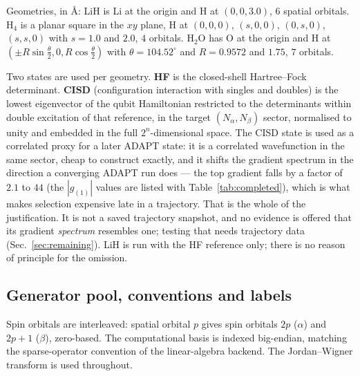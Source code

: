\documentclass[10pt]{article}
\begin{document}
Geometries, in \si{\angstrom}: LiH is Li at the origin and H at $(0,0,3.0)$,
$6$ spatial orbitals. H$_4$ is a planar square in the $xy$ plane, H at $(0,0,0)$,
$(s,0,0)$, $(0,s,0)$, $(s,s,0)$ with $s=1.0$ and $2.0$, $4$ orbitals. H$_2$O has
O at the origin and H at $(\pm R\sin\tfrac{\theta}{2},0,R\cos\tfrac{\theta}{2})$
with $\theta=104.52^\circ$ and $R=0.9572$ and $1.75$, $7$ orbitals.

Two states are used per geometry. \textbf{HF} is the closed-shell Hartree--Fock determinant. \textbf{CISD} (configuration interaction with singles and doubles) is the lowest eigenvector of the qubit Hamiltonian restricted to the determinants within double excitation of that reference, in the target $(N_\alpha,N_\beta)$ sector, normalised to unity and embedded in the full $2^{n}$-dimensional space. The CISD state is used as a correlated proxy for a later ADAPT state: it is a correlated wavefunction in the same sector, cheap to construct exactly, and it shifts the gradient spectrum in the direction a converging ADAPT run does --- the top gradient falls by a factor of $2.1$ to $44$ (the $|g_{(1)}|$ values are listed with Table~\ref{tab:completed}), which is what makes selection expensive late in a trajectory. That is the whole of the justification. It is not a saved trajectory snapshot, and no evidence is offered that its gradient \emph{spectrum} resembles one; testing that needs trajectory data (Sec.~\ref{sec:remaining}). LiH is run with the HF reference only; there is no reason of principle for the omission.

\subsection{Generator pool, conventions and labels}

Spin orbitals are interleaved: spatial orbital $p$ gives spin orbitals $2p$ ($\alpha$) and $2p+1$ ($\beta$), zero-based. The computational basis is indexed big-endian, matching the sparse-operator convention of the linear-algebra backend. The Jordan--Wigner transform is used throughout.
\end{document}
